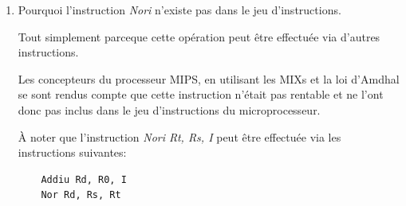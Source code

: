 \begin{enumerate}
    \begin{correction}

      Tout simplement parceque l'instruction \textit{Add} est une
      op\'eration arithm\'etique et peut donc s'utiliser avec des
      imm\'ediats sign\'es ou non.

      En revanche, l'instruction \textit{Oriu} n'a aucun sens puisque
      l'instruction \textit{Or} est une op\'eration logique. De ce fait
      l'imm\'ediat sera toujours consid\'er\'e comme non sign\'e.

      L'ajout du suffixe \textbf{u} n'a donc aucun sens pour cette instruction.

    \end{correction}
  \item
    Pourquoi l'instruction \textit{Nori} n'existe pas dans le jeu
    d'instructions.

    \begin{correction}

      Tout simplement parceque cette op\'eration peut \^etre effectu\'ee
      via d'autres instructions.

      Les concepteurs du processeur MIPS, en utilisant les MIXs et la
      loi d'Amdhal se sont rendus compte que cette instruction n'\'etait
      pas rentable et ne l'ont donc pas inclus dans le jeu d'instructions
      du microprocesseur.

      \`A noter que l'instruction \textit{Nori Rt, Rs, I} peut
      \^etre effectu\'ee via les instructions suivantes:

      \begin{verbatim}
	Addiu Rd, R0, I
	Nor Rd, Rs, Rt
      \end{verbatim}

    \end{correction}

\end{enumerate}


